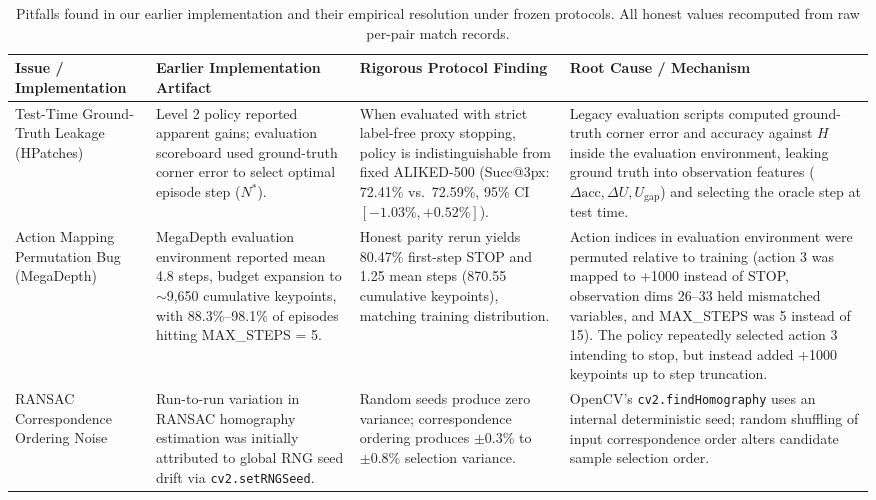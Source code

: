 \begin{table}[t]
\centering
\caption{Pitfalls found in our earlier implementation and their empirical resolution under frozen protocols. All honest values recomputed from raw per-pair match records.}
\label{tab:audit_table}
\small
\begin{tabular}{p{3.2cm}p{3.8cm}p{3.8cm}p{5.2cm}}
\hline
\textbf{Issue / Implementation} & \textbf{Earlier Implementation Artifact} & \textbf{Rigorous Protocol Finding} & \textbf{Root Cause / Mechanism} \\
\hline
Test-Time Ground-Truth Leakage (HPatches) & Level 2 policy reported apparent gains; evaluation scoreboard used ground-truth corner error to select optimal episode step ($N^*$). & When evaluated with strict label-free proxy stopping, policy is indistinguishable from fixed ALIKED-500 (Succ@3px: 72.41\% vs.\ 72.59\%, 95\% CI $[-1.03\%, +0.52\%]$). & Legacy evaluation scripts computed ground-truth corner error and accuracy against $H$ inside the evaluation environment, leaking ground truth into observation features ($\Delta\text{acc}, \Delta U, U_{\text{gap}}$) and selecting the oracle step at test time. \\
\hline
Action Mapping Permutation Bug (MegaDepth) & MegaDepth evaluation environment reported mean 4.8 steps, budget expansion to $\sim$9,650 cumulative keypoints, with 88.3\%--98.1\% of episodes hitting MAX\_STEPS = 5. & Honest parity rerun yields 80.47\% first-step STOP and 1.25 mean steps (870.55 cumulative keypoints), matching training distribution. & Action indices in evaluation environment were permuted relative to training (action 3 was mapped to +1000 instead of STOP, observation dims 26--33 held mismatched variables, and MAX\_STEPS was 5 instead of 15). The policy repeatedly selected action 3 intending to stop, but instead added +1000 keypoints up to step truncation. \\
\hline
RANSAC Correspondence Ordering Noise & Run-to-run variation in RANSAC homography estimation was initially attributed to global RNG seed drift via \texttt{cv2.setRNGSeed}. & Random seeds produce zero variance; correspondence ordering produces $\pm 0.3\%$ to $\pm 0.8\%$ selection variance. & OpenCV's \texttt{cv2.findHomography} uses an internal deterministic seed; random shuffling of input correspondence order alters candidate sample selection order. \\
\hline
\end{tabular}
\end{table}

